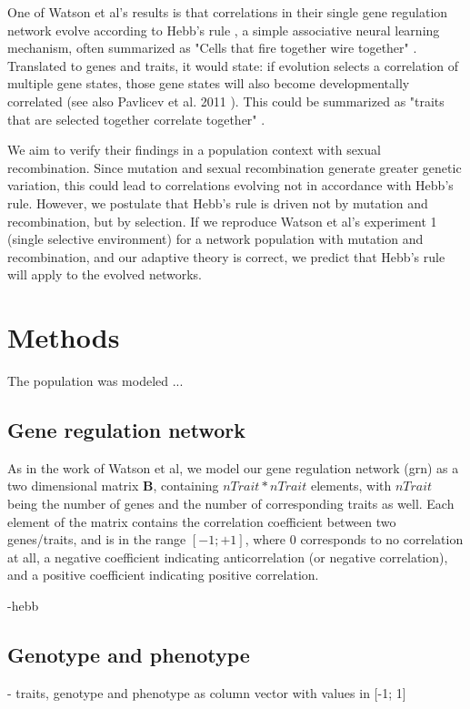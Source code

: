 \documentclass{article}
\begin{document}
One of Watson et al's results is that correlations in their single gene regulation network evolve according to Hebb’s rule \cite{hebb}, a simple associative neural learning mechanism, often summarized as "Cells that fire together wire together" \cite{shatz1992}.
Translated to genes and traits, it would state: if evolution selects a correlation of multiple gene states, those gene states will also become developmentally correlated (see also Pavlicev et al. 2011 \cite{pavlicev2011}).
This could be summarized as "traits that are selected together correlate together" \cite{watson2014}.

We aim to verify their findings in a population context with sexual recombination.
Since mutation and sexual recombination generate greater genetic variation, this could lead to correlations evolving not in accordance with Hebb's rule. However, we postulate that Hebb’s rule is driven not by mutation and recombination, but by selection.
If we reproduce Watson et al’s experiment 1 (single selective environment) for a network population with mutation and recombination, and our adaptive theory is correct, we predict that Hebb’s rule will apply to the evolved networks.

\section{Methods}

The population was modeled ...

\subsection{Gene regulation network}

As in the work of Watson et al, we model our gene regulation network (grn) as a two dimensional matrix $\bm{B}$, containing $nTrait * nTrait$ elements, with $nTrait$ being the number of genes and the number of corresponding traits as well.
Each element of the matrix contains the correlation coefficient between two genes/traits, and is in the range $[-1; +1]$, where 0 corresponds to no correlation at all, a negative coefficient indicating anticorrelation (or negative correlation), and a positive coefficient indicating positive correlation.

-hebb

\subsection{Genotype and phenotype}
- traits, genotype and phenotype as column vector with values in [-1; 1]
\end{document}
